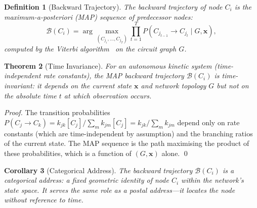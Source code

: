 \documentclass[11pt,twocolumn,a4paper]{article}
\newtheorem{theorem}{Theorem}[section]
\newtheorem{corollary}[theorem]{Corollary}
\newtheorem{definition}[theorem]{Definition}
\newcommand{\Back}{\mathcal{B}}
\begin{document}
\begin{definition}[Backward Trajectory]
\label{def:backward}
The \emph{backward trajectory} of node $C_i$ is the
maximum-a-posteriori (MAP) sequence of predecessor nodes:
\begin{equation}
  \Back(C_i) = \arg\max_{(C_{j_1}, \ldots, C_{j_T})}
  \prod_{t=1}^{T} P(C_{j_{t-1}} \to C_{j_t} \mid G, \mathbf{x}),
  \label{eq:backward}
\end{equation}
computed by the Viterbi algorithm~\citep{viterbi1967,rabiner1989} on
the circuit graph $G$.
\end{definition}

\begin{theorem}[Time Invariance]
\label{thm:time-invariance}
For an autonomous kinetic system (time-independent rate constants),
the MAP backward trajectory $\Back(C_i)$ is time-invariant: it
depends on the current state $\mathbf{x}$ and network topology $G$
but not on the absolute time $t$ at which observation occurs.
\end{theorem}

\begin{proof}
The transition probabilities
$P(C_j \to C_k) = k_{jk}[C_j] / \sum_m k_{jm}[C_j]
= k_{jk} / \sum_m k_{jm}$ depend only on rate constants (which are
time-independent by assumption) and the branching ratios of the
current state.  The MAP sequence is the path maximising the product
of these probabilities, which is a function of $(G, \mathbf{x})$
alone.  \qed
\end{proof}

\begin{corollary}[Categorical Address]
\label{cor:categorical-address}
The backward trajectory $\Back(C_i)$ is a \emph{categorical address}:
a fixed geometric identity of node $C_i$ within the network's state
space.  It serves the same role as a postal address---it locates the
node without reference to time.
\end{corollary}
\end{document}
